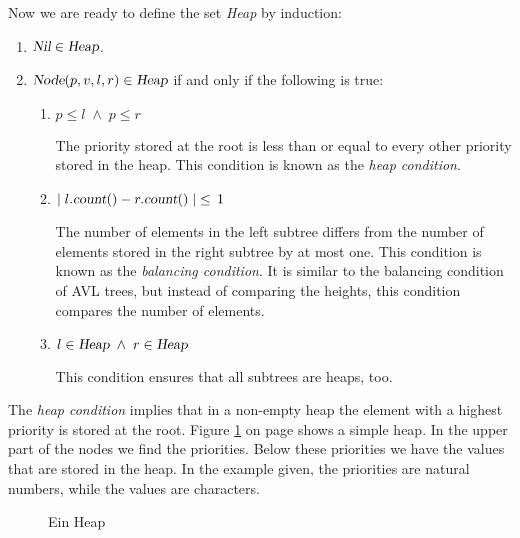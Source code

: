 Now we are ready to define the set \textsl{Heap} by induction:
\begin{enumerate}
\item $\textsl{Nil} \in \textsl{Heap}$.
\item $\textsl{Node}(p,v,l,r) \in \textsl{Heap}$ if and only if the following is true:
      \begin{enumerate}
      \item $p \leq l \;\wedge\; p \leq r$

            The priority stored at the root is less than or equal to every other priority stored in
            the heap. This condition is known as the \emph{heap condition}.
      \item $\mid l.\textsl{count}() - r.\textsl{count}() \mid \;\leq\, 1$

            The number of elements in the left subtree differs from the number of elements stored in
            the right subtree by at most one.
            This condition is known as the  \emph{balancing condition}.  It is similar to the
            balancing condition of AVL trees, but instead of comparing the heights, this condition
            compares the number of elements.
      \item $l \in \textsl{Heap} \;\wedge\; r \in \textsl{Heap}$

            This condition ensures that all subtrees are heaps, too.
      \end{enumerate}
\end{enumerate}
The  \emph{heap condition} implies that in a non-empty heap the element with a highest priority is
stored at the root.  Figure \ref{fig:heap-list} on page \pageref{fig:heap-list} shows a simple heap.
In the upper part of the nodes we find the priorities.  Below these priorities we have the values
that are stored in the heap.  In the example given, the priorities are natural numbers, while the
values are characters.


\begin{figure}[!t]
  \centering
  \caption{Ein Heap}
  \label{fig:heap-list}
\end{figure}

